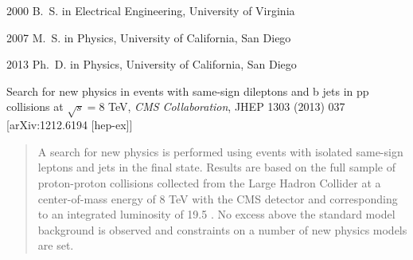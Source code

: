\begin{frontmatter}
\begin{vitapage}                                                               
\begin{vita}                                                                   
  \item[2000] B.~S. in Electrical Engineering, University of Virginia
  \item[2007] M.~S. in Physics, University of California, San Diego
  \item[2013] Ph.~D. in Physics, University of California, San Diego       
\end{vita}                                                                     
\begin{publications}                                                           
  \item Search for new physics in events with same-sign dileptons and b jets in pp collisions at $\sqrt{s} = 8$ TeV, {\it CMS Collaboration}, JHEP 1303 (2013) 037 [arXiv:1212.6194 [hep-ex]] %
\end{publications}                                                             
\end{vitapage}                                                                 
                                                                               

\begin{abstract}

A search for new physics is performed using events with isolated same-sign
leptons and jets in the final state. Results are based on the full sample
of proton-proton collisions collected from the Large Hadron Collider at a
center-of-mass energy of 8 TeV with the CMS detector and corresponding to
an integrated luminosity of 19.5 \fbinv. No excess above the standard model
background is observed and constraints on a number of new physics models are
set. 

\end{abstract}


\end{frontmatter}
